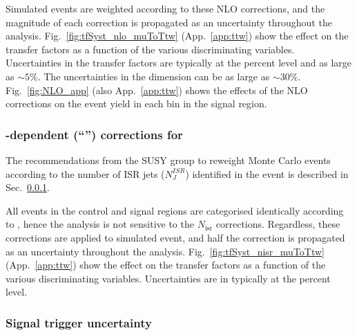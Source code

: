 Simulated \wj events are weighted according to these NLO corrections,
and the magnitude of each correction is propagated as an uncertainty
throughout the analysis. Fig.~\ref{fig:tfSyst_nlo_muToTtw}
(App.~\ref{app:ttw}) show the effect on the transfer factors as a
function of the various discriminating variables. Uncertainties in the
transfer factors are typically at the percent level and as large as
$\sim 5\%$. The uncertainties in the \mht dimension can be as large as
${\sim}30\%$. Fig.~\ref{fig:NLO_app} (also App.~\ref{app:ttw}) shows
the effects of the NLO corrections on the event yield in each bin in
the signal region.


\subsubsection{\texorpdfstring{\njet}{Njet}-dependent (``\texorpdfstring{\nisr}{Nisr}'') corrections for \texorpdfstring{\ttbar}{TTbar}}
\label{sec:nisr}

The recommendations from the SUSY group to reweight \MADGRAPH \ttbar
Monte Carlo events according to the number of ISR jets ($N_J^{ISR}$)
identified in the event is described in
Sec.~\ref{sec:nisr}. 

All events in the control and signal regions are categorised
identically according to \njet, hence the analysis is not sensitive to
the $N_\textrm{isr}$ corrections. Regardless, these corrections are
applied to simulated \ttbar event, and half the correction is
propagated as an uncertainty throughout the
analysis. Fig.~\ref{fig:tfSyst_nisr_muToTtw} (App.~\ref{app:ttw}) show
the effect on the transfer factors as a function of the various
discriminating variables. Uncertainties are in typically at the
percent level. 

\subsubsection{Signal trigger uncertainty}
\label{sec:tfSyst_trigger}

